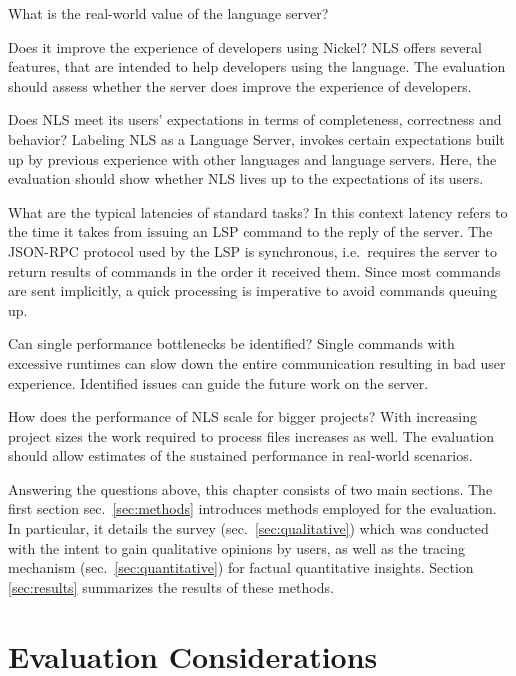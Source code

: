 \documentclass[
  a4paper,
  bibtex,
  english,
  nomenclature]{kthlatex/kththesis/kththesis}
\providecommand{\tightlist}{%
  \setlength{\itemsep}{0pt}\setlength{\parskip}{0pt}}
\begin{document}
\begin{description}
\tightlist
\item[Usability]
What is the real-world value of the language server?

Does it improve the experience of developers using Nickel? NLS offers
several features, that are intended to help developers using the
language. The evaluation should assess whether the server does improve
the experience of developers.

Does NLS meet its users' expectations in terms of completeness,
correctness and behavior? Labeling NLS as a Language Server, invokes
certain expectations built up by previous experience with other
languages and language servers. Here, the evaluation should show whether
NLS lives up to the expectations of its users.
\item[Performance]
What are the typical latencies of standard tasks? In this context
latency refers to the time it takes from issuing an LSP command to the
reply of the server. The JSON-RPC protocol used by the LSP is
synchronous, i.e.~requires the server to return results of commands in
the order it received them. Since most commands are sent implicitly, a
quick processing is imperative to avoid commands queuing up.

Can single performance bottlenecks be identified? Single commands with
excessive runtimes can slow down the entire communication resulting in
bad user experience. Identified issues can guide the future work on the
server.

How does the performance of NLS scale for bigger projects? With
increasing project sizes the work required to process files increases as
well. The evaluation should allow estimates of the sustained performance
in real-world scenarios.
\end{description}

Answering the questions above, this chapter consists of two main
sections. The first section sec.~\ref{sec:methods} introduces methods
employed for the evaluation. In particular, it details the survey
(sec.~\ref{sec:qualitative}) which was conducted with the intent to gain
qualitative opinions by users, as well as the tracing mechanism
(sec.~\ref{sec:quantitative}) for factual quantitative insights. Section
\ref{sec:results} summarizes the results of these methods.

\hypertarget{sec:evaluation-considerations}{%
\section{Evaluation
Considerations}\label{sec:evaluation-considerations}}
\end{document}
